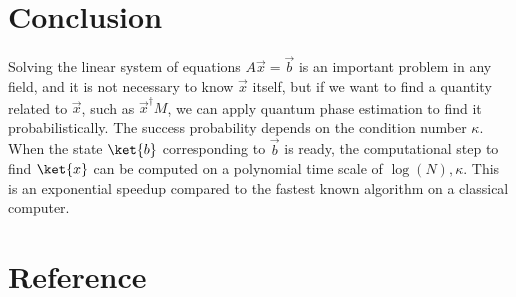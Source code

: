 \documentclass[b5paper,papersize,dvipdfmx,fleqn]{jsarticle}
\begin{document}
\section{Conclusion}
Solving the linear system of equations $A\vec{x}=\vec{b}$ is an important problem in any field\cite{Harrow2009}, and it is not necessary to know $\vec{x}$ itself, but if we want to find a quantity related to $\vec{x}$, such as $\vec{x}^\dagger M$, we can apply quantum phase estimation to find it probabilistically. The success probability depends on the condition number $\kappa $.
When the state $\ket{b}$ corresponding to $\vec{b}$ is ready, the computational step to find $\ket{x}$ can be computed on a polynomial time scale of $\log(N), \kappa $. This is an exponential speedup compared to the fastest known algorithm on a classical computer.


\section{Reference}


%
%
%

\end{document}

